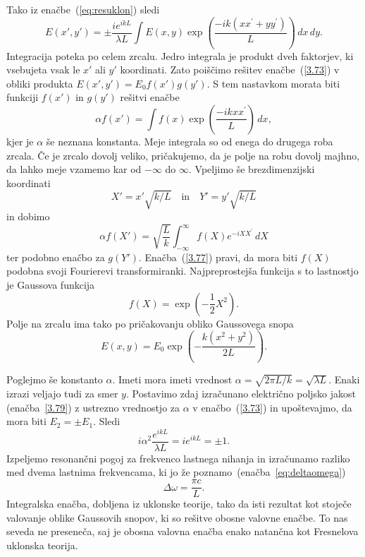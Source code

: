 Tako iz enačbe~(\ref{eq:resuklon})
sledi
\begin{equation}
E(x',y')=\pm\frac{ie^{ikL}}{\lambda L}\int E(x,y)\exp
\left(\frac{-ik(xx^{\prime}+yy^{\prime})}{L}\right)\, dx\, dy.
\label{3.73}
\end{equation}
Integracija poteka po celem zrcalu. Jedro integrala je produkt dveh
faktorjev, ki vsebujeta vsak le $x'$ ali $y'$ koordinati. Zato poiščimo
rešitev enačbe~(\ref{3.73}) v obliki produkta 
$
E(x',y')=E_{0}f(x')g(y').
$
S tem nastavkom morata biti funkciji $f(x')$ in $g(y')$ rešitvi enačbe
\begin{equation}
\alpha f(x')=\int f(x)\exp\left(\frac{-ikxx^{\prime}}{L}\right)\, dx,
\label{3.75}
\end{equation}
kjer je $\alpha$ še neznana konstanta. Meje integrala so od enega do 
drugega roba zrcala. Če je zrcalo dovolj veliko,
pričakujemo, da je polje na robu dovolj majhno, da lahko meje vzamemo
kar od $-\infty$ do $\infty$. Vpeljimo še brezdimenzijski koordinati
\begin{equation}
X'=x'\sqrt{k/L} \quad \mathrm{in} \quad Y'=y'\sqrt{k/L}
\label{3.76}
\end{equation}
in dobimo
\begin{equation}
\alpha f(X')=\sqrt{\frac{L}{k}}\int_{-\infty}^{\infty}f(X)e^{-iXX^{\prime}}\, dX
\label{3.77}
\end{equation}
ter podobno enačbo za $g(Y')$. Enačba~(\ref{3.77}) pravi, da mora
biti $f(X)$ podobna svoji Fourierevi transformiranki. Najpreprostejša
funkcija s to lastnostjo je Gaussova funkcija 
\begin{equation}
f(X)=\exp\left(-\frac{1}{2}X^{2}\right).
\label{3.78}
\end{equation}
Polje na zrcalu ima tako po pričakovanju obliko Gaussovega snopa
\begin{equation}
E(x,y)=E_{0}\exp\left(-\frac{k(x^{2}+y^{2})}{2L}\right).
\label{3.79}
\end{equation}

Poglejmo še konstanto $\alpha$. Imeti mora imeti vrednost 
$\alpha = \sqrt{2\pi L/k}=\sqrt{\lambda L}$.
Enaki izrazi veljajo tudi za smer $y$. Postavimo zdaj izračunano električno 
poljsko jakost (enačba~\ref{3.79}) z ustrezno vrednostjo za $\alpha$ v 
enačbo~(\ref{3.73}) in upoštevajmo, da mora biti
$E_{2}=\pm E_{1}$. Sledi
\begin{equation}
i\alpha^{2}\frac{e^{ikL}}{\lambda L}=ie^{ikL}=\pm1.
\label{3.80}
\end{equation}
Izpeljemo resonančni pogoj za
frekvenco lastnega nihanja in izračunamo razliko med dvema lastnima frekvencama, ki jo že poznamo~(enačba~\ref{eq:deltaomega})
\begin{equation}
\Delta \omega=\frac{\pi c}{L}.
\label{3.81}
\end{equation}
Integralska enačba, dobljena iz uklonske teorije, tako da
isti rezultat kot stoječe valovanje oblike Gaussovih snopov, ki so
rešitve obosne valovne enačbe. To nas seveda ne preseneča, saj je
obosna valovna enačba enako natančna kot Fresnelova uklonska teorija.

